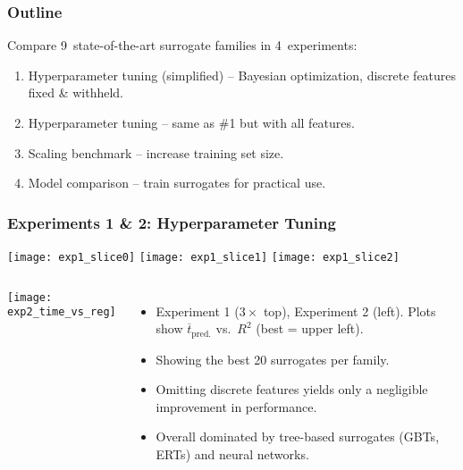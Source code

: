 \begin{frame}
	\frametitle{Outline}
	Compare 9~state-of-the-art surrogate families in 4~experiments:
	
	\begin{enumerate}
		\item
			Hyperparameter tuning (simplified) -- Bayesian optimization,
			discrete features fixed \& withheld.
		\item
			Hyperparameter tuning -- same as \#1 but with all features.
		\item
			Scaling benchmark -- increase training set size.
		\item
			Model comparison -- train surrogates for practical use.
	\end{enumerate}
\end{frame}

\begin{frame}
	\frametitle{Experiments 1 \& 2: Hyperparameter Tuning}

	\texttt{[image: exp1\_slice0]}\hfill%
	\texttt{[image: exp1\_slice1]}\hfill%
	\texttt{[image: exp1\_slice2]}

	\begin{columns}
		\texttt{[image: exp2\_time\_vs\_reg]}

		\begin{itemize}
			\item
				Experiment 1 ($3\times$ top), Experiment 2 (left).
				Plots show $\overline{t}_\text{pred.}$ vs.~$R^2$ (best = upper
				left).
			\item
				Showing the best 20 surrogates per family.
			\item
				Omitting discrete features yields only a negligible
				improvement in performance.
			\item
				Overall dominated by tree-based surrogates (GBTs, ERTs) and
				neural networks.
		\end{itemize}
	\end{columns}

\end{frame}

